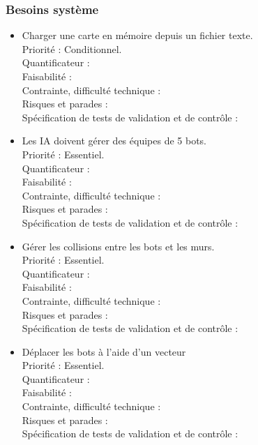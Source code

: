\documentclass{article}
\begin{document}
\subsubsection{Besoins système}
    
    \begin{itemize}

        \item Charger une carte en mémoire depuis un fichier texte. \\
                Priorité : Conditionnel.\\
                Quantificateur : \\
                Faisabilité : \\
                Contrainte, difficulté technique : \\
                Risques et parades : \\
                Spécification de tests de validation et de contrôle : \\

        \item Les IA doivent gérer des équipes de 5 bots. \\
                Priorité : Essentiel.\\
                Quantificateur : \\
                Faisabilité : \\
                Contrainte, difficulté technique : \\
                Risques et parades : \\
                Spécification de tests de validation et de contrôle : \\

        \item Gérer les collisions entre les bots et les murs. \\
                Priorité : Essentiel.\\
                Quantificateur : \\
                Faisabilité : \\
                Contrainte, difficulté technique : \\
                Risques et parades : \\
                Spécification de tests de validation et de contrôle : \\

        \item Déplacer les bots à l'aide d'un vecteur \\
                Priorité : Essentiel.\\
                Quantificateur : \\
                Faisabilité : \\
                Contrainte, difficulté technique : \\
                Risques et parades : \\
                Spécification de tests de validation et de contrôle : \\
                

\end{itemize}
\end{document}
